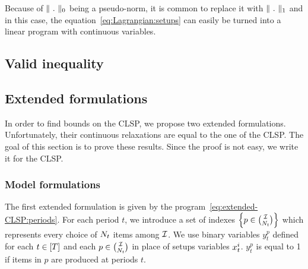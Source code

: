 Because of $\norm{\ .\ }_0$ being a pseudo-norm, it is common to replace it with $\norm{\ .\ }_1$ and in this case, the equation~\eqref{eq:Lagrangian:setups} can easily be turned into a linear program with continuous variables.




\subsection{Valid inequality}





\subsection{Extended formulations}


In order to find bounds on the CLSP, we propose two extended formulations. Unfortunately, their continuous relaxations are equal to the one of the CLSP. The goal of this section is to prove these results. Since the proof is not easy, we write it for the CLSP.



\subsubsection{Model formulations}

The first extended formulation is given by the program~\eqref{eq:extended-CLSP:periods}. For each period $t$, we introduce a set of indexes $\crbracket{p\in{\REF\choose\nbsetups_t}}$ which represents every choice of $N_t$ items among $\mathcal{I}$. We use binary variables $y_t^p$ defined for each $t\in\range{\horizon}$ and each $p\in{\mathcal{I}\choose N_t}$ in place of setups variables $x_t^i$. $y_t^p$ is equal to 1 if items in $p$ are produced at periods $t$.

